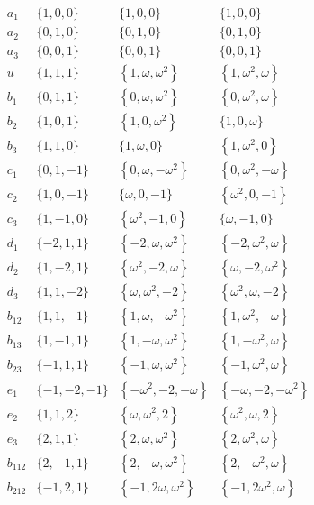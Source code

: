 \documentclass[pra,twocolumn,nofootinbib]{revtex4-2}
\begin{document}
$$
\begin{array}{ccccc}
 {a_1} & \{1,0,0\} & \{1,0,0\} & \{1,0,0\} \\
 {a_2} & \{0,1,0\} & \{0,1,0\} & \{0,1,0\} \\
 {a_3} & \{0,0,1\} & \{0,0,1\} & \{0,0,1\} \\
 {u} & \{1,1,1\} & \left\{1,\omega ,\omega^2\right\} & \left\{1,\omega ^2,\omega \right\} \\
 {b_1} & \{0,1,1\} & \left\{0,\omega ,\omega^2\right\} & \left\{0,\omega ^2,\omega \right\} \\
 {b_2} & \{1,0,1\} & \left\{1,0,\omega ^2\right\}  & \{1,0,\omega \} \\
 {b_3} & \{1,1,0\} & \{1,\omega ,0\} & \left\{1,\omega ^2,0\right\} \\
 {c_1} & \{0,1,-1\} & \left\{0,\omega ,-\omega^2\right\} & \left\{0,\omega ^2,-\omega \right\} \\
 {c_2} & \{1,0,-1\} & \{\omega ,0,-1\} &  \left\{\omega ^2,0,-1\right\} \\
 {c_3} & \{1,-1,0\} & \left\{\omega^2,-1,0\right\} & \{\omega ,-1,0\} \\
 {d_1} & \{-2,1,1\} & \left\{-2,\omega ,\omega^2\right\} & \left\{-2,\omega ^2,\omega \right\} \\
 {d_2} & \{1,-2,1\} & \left\{\omega ^2,-2,\omega  \right\} & \left\{\omega ,-2,\omega ^2\right\} \\
 {d_3} & \{1,1,-2\} & \left\{\omega ,\omega  ^2,-2\right\} & \left\{\omega ^2,\omega ,-2\right\} \\
 {b_{12}} & \{1,1,-1\} & \left\{1,\omega  ,-\omega ^2\right\} & \left\{1,\omega ^2,-\omega   \right\} \\
 {b_{13}} & \{1,-1,1\} & \left\{1,-\omega  ,\omega ^2\right\} & \left\{1,-\omega ^2,\omega  \right\} \\
 {b_{23}} & \{-1,1,1\} & \left\{-1,\omega   ,\omega ^2\right\} & \left\{-1,\omega ^2,\omega   \right\} \\
 {e_1} & \{-1,-2,-1\} & \left\{-\omega   ^2,-2,-\omega \right\} & \left\{-\omega ,-2,-\omega  ^2\right\} \\
 {e_2} & \{1,1,2\} & \left\{\omega ,\omega^2,2\right\} & \left\{\omega ^2,\omega ,2\right\} \\
 {e_3} & \{2,1,1\} & \left\{2,\omega ,\omega ^2\right\} & \left\{2,\omega ^2,\omega \right\} \\
 {b_{112}} & \{2,-1,1\} & \left\{2,-\omega,\omega ^2\right\} & \left\{2,-\omega ^2,\omega  \right\} \\
 {b_{212}} & \{-1,2,1\} & \left\{-1,2 \omega  ,\omega ^2\right\} & \left\{-1,2 \omega ^2,\omega  \right\} \\

\end{array}$$
\end{document}
